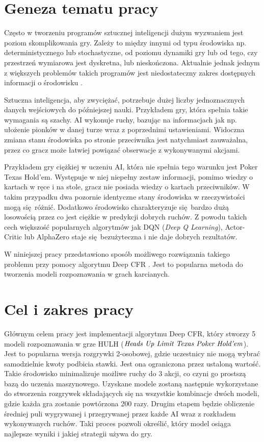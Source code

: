 \documentclass[12pt,oneside,a4paper]{report}
\begin{document}
\section{Geneza tematu pracy}

Często w tworzeniu programów sztucznej inteligencji dużym 
wyzwaniem jest poziom skomplikowania gry. 
Zależy to między innymi od typu środowiska np. deterministycznego lub stochastyczne, 
od poziomu dynamiki gry lub od tego, czy przestrzeń wymiarowa jest
dyskretna, lub nieskończona.
Aktualnie jednak jednym z większych problemów takich programów jest niedostateczny
zakres dostępnych informacji o środowisku \cite{CFR}.

Sztuczna inteligencja, aby zwyciężać,
potrzebuje dużej liczby jednoznacznych danych wejściowych do późniejszej nauki.
Przykładem gry, która spełnia takie wymagania są szachy. 
AI wykonuje ruchy, bazując na informacjach jak np. ułożenie pionków
w danej turze wraz z poprzednimi ustawieniami. Widoczna zmiana stanu środowiska po stronie 
przeciwnika jest
natychmiast zauważalna, przez co gracz może łatwiej powiązać
obserwacje z wykonywanymi akcjami. 

Przykładem gry ciężkiej w uczeniu AI, która nie spełnia tego warunku jest Poker Texas
Hold'em.
Występuje w niej niepełny zestaw informacji, pomimo wiedzy o kartach w ręce i na stole, gracz nie posiada
wiedzy o 
kartach przeciwników. W takim przypadku dwa pozornie identyczne stany środowiska w
rzeczywistości mogą się różnić. Dodatkowo środowisko charakteryzuje się bardzo dużą losowością przez
co jest ciężkie w predykcji dobrych ruchów. Z powodu takich cech większość popularnych algorytmów jak 
DQN (\emph{Deep Q Learning}), Actor-Critic lub AlphaZero staje się bezużyteczna i nie daje dobrych rezultatów.

W niniejszej pracy przedstawiono sposób możliwego rozwiązania takiego problemu przy pomocy 
algorytmu Deep CFR \cite{DCFR}. Jest to popularna metoda do tworzenia modeli
rozpoznawania w grach karcianych.

\section{Cel i zakres pracy}

Głównym celem pracy jest implementacji algorytmu Deep CFR, który stworzy 5 modeli
rozpoznawania w grze HULH ($\text{\emph{Heads Up Limit Texas 
Poker Hold'em}}$). Jest to popularna wersja rozgrywki 2-osobowej, gdzie uczestnicy nie mogą wybrać
samodzielnie kwoty podbicia stawki. Jest ona ograniczona przez ustaloną wartość. Takie środowisko
minimalizuje możliwe ruchy do 3 akcji, co czyni go prostszą bazą do uczenia maszynowego. Uzyskane modele zostaną następnie 
wykorzystane do stworzenia
rozgrywek składających się na wszystkie kombinacje dwóch modeli, gdzie każda gra zostanie 
powtórzona 200 razy. Drugim etapem
będzie obliczenie średniej puli wygrywanej i przegrywanej przez każde AI wraz z rozkładem
wykonywanych ruchów.
Taki proces pozwoli określić, który model osiąga najlepsze wyniki i jakiej strategii używa do gry.
\end{document}
